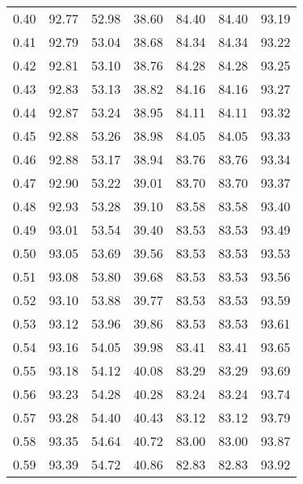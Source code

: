 \begin{tabular}{|c|c|c|c|c|c|c|}
      0.40 &     92.77 &     52.98 &      38.60 &   84.40 &      84.40 &         93.19 \\
      0.41 &     92.79 &     53.04 &      38.68 &   84.34 &      84.34 &         93.22 \\
      0.42 &     92.81 &     53.10 &      38.76 &   84.28 &      84.28 &         93.25 \\
      0.43 &     92.83 &     53.13 &      38.82 &   84.16 &      84.16 &         93.27 \\
      0.44 &     92.87 &     53.24 &      38.95 &   84.11 &      84.11 &         93.32 \\
      0.45 &     92.88 &     53.26 &      38.98 &   84.05 &      84.05 &         93.33 \\
      0.46 &     92.88 &     53.17 &      38.94 &   83.76 &      83.76 &         93.34 \\
      0.47 &     92.90 &     53.22 &      39.01 &   83.70 &      83.70 &         93.37 \\
      0.48 &     92.93 &     53.28 &      39.10 &   83.58 &      83.58 &         93.40 \\
      0.49 &     93.01 &     53.54 &      39.40 &   83.53 &      83.53 &         93.49 \\
      0.50 &     93.05 &     53.69 &      39.56 &   83.53 &      83.53 &         93.53 \\
      0.51 &     93.08 &     53.80 &      39.68 &   83.53 &      83.53 &         93.56 \\
      0.52 &     93.10 &     53.88 &      39.77 &   83.53 &      83.53 &         93.59 \\
      0.53 &     93.12 &     53.96 &      39.86 &   83.53 &      83.53 &         93.61 \\
      0.54 &     93.16 &     54.05 &      39.98 &   83.41 &      83.41 &         93.65 \\
      0.55 &     93.18 &     54.12 &      40.08 &   83.29 &      83.29 &         93.69 \\
      0.56 &     93.23 &     54.28 &      40.28 &   83.24 &      83.24 &         93.74 \\
      0.57 &     93.28 &     54.40 &      40.43 &   83.12 &      83.12 &         93.79 \\
      0.58 &     93.35 &     54.64 &      40.72 &   83.00 &      83.00 &         93.87 \\
      0.59 &     93.39 &     54.72 &      40.86 &   82.83 &      82.83 &         93.92 \\

\end{tabular}
